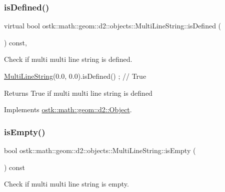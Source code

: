\subsubsection{\texorpdfstring{is\+Defined()}{isDefined()}}
{\footnotesize\ttfamily virtual bool ostk\+::math\+::geom\+::d2\+::objects\+::\+Multi\+Line\+String\+::is\+Defined (\begin{DoxyParamCaption}{ }\end{DoxyParamCaption}) const\hspace{0.3cm}{\ttfamily [override]}, {\ttfamily [virtual]}}



Check if multi multi line string is defined. 


\begin{DoxyCode}
\hyperlink{classostk_1_1math_1_1geom_1_1d2_1_1objects_1_1_multi_line_string_a5a30febbcbc28097e34b6f2f3f456b79}{MultiLineString}(0.0, 0.0).isDefined() ; \textcolor{comment}{// True}
\end{DoxyCode}


\begin{DoxyReturn}{Returns}
True if multi multi line string is defined 
\end{DoxyReturn}


Implements \hyperlink{classostk_1_1math_1_1geom_1_1d2_1_1_object_a456cc7121218d24c1322d0fe54230cc4}{ostk\+::math\+::geom\+::d2\+::\+Object}.

\mbox{\label{classostk_1_1math_1_1geom_1_1d2_1_1objects_1_1_multi_line_string_a5d9130266958b3cddbcfd9ac085074f9}} 
\subsubsection{\texorpdfstring{is\+Empty()}{isEmpty()}}
{\footnotesize\ttfamily bool ostk\+::math\+::geom\+::d2\+::objects\+::\+Multi\+Line\+String\+::is\+Empty (\begin{DoxyParamCaption}{ }\end{DoxyParamCaption}) const}



Check if multi multi line string is empty. 


